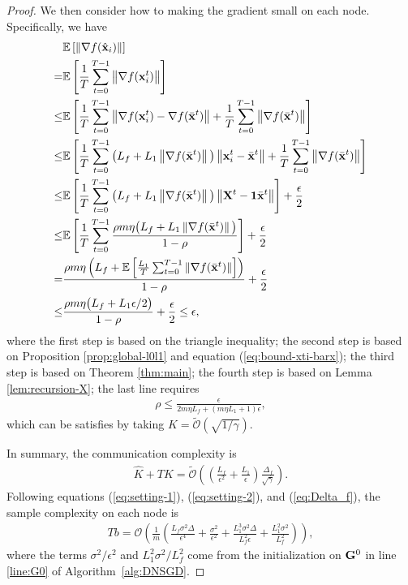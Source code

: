 \documentclass[sigconf]{acmart}
\newcommand{\Norm}[1]{\left\| #1 \right\|}
\def\vone{{\bf{1}}}
\def\vx{{\bf{x}}}
\def\fO{{\mathcal{O}}}
\def\BE{{\mathbb{E}}}
\def\mG {{\bf G}}
\def\mX {{\bf X}}
\theoremstyle{plain}
\def\bx{{\bar\vx}}
\begin{document}
\begin{proof}
We then consider how to making the gradient small on each node.
Specifically, we have
\begin{align*}
& \BE\left[\Norm{\nabla f(\hat\vx_i)}\right] \\
= & \BE\left[\frac{1}{T}\sum_{t=0}^{T-1}\Norm{\nabla f(\vx_i^t)}\right] \\
\leq & \BE\left[\frac{1}{T}\sum_{t=0}^{T-1}\Norm{\nabla f(\vx_i^t)-\nabla f(\bx^t)} + \frac{1}{T}\sum_{t=0}^{T-1}\Norm{\nabla f(\bx^t)}\right] \\
\leq & \BE\left[\frac{1}{T}\sum_{t=0}^{T-1}\big(L_f+L_1\Norm{\nabla f(\bx^t)}\big)\Norm{\vx_i^t - \bx^t} + \frac{1}{T}\sum_{t=0}^{T-1}\Norm{\nabla f(\bx^t)}\right] \\
\leq & \BE\left[\frac{1}{T}\sum_{t=0}^{T-1}\big(L_f+L_1\Norm{\nabla f(\bx^t)}\big)\Norm{\mX^t - \vone\bx^t
}\right] + \frac{\epsilon}{2} \\
\leq & \BE\left[\frac{1}{T}\sum_{t=0}^{T-1}\frac{\rho m\eta\big(L_f+L_1\Norm{\nabla f(\bx^t)}\big)}{1-\rho}\right] + \frac{\epsilon}{2} \\
= & \frac{\rho m\eta\left(L_f+\BE\left[\frac{L_1}{T}\sum_{t=0}^{T-1}\Norm{\nabla f(\bx^t)}\right]\right)}{1-\rho}+ \frac{\epsilon}{2} \\
\leq & \frac{\rho m\eta\big(L_f+L_1\epsilon/2
\big)}{1-\rho}+ \frac{\epsilon}{2} 
\leq \epsilon,
\end{align*}
where the first step is based on the triangle inequality;
the second step is based on Proposition \ref{prop:global-l0l1} and equation (\ref{eq:bound-xti-barx});
the third step is based on Theorem \ref{thm:main};
the fourth step is based on Lemma \ref{lem:recursion-X};
the last line requires
\begin{align*}
    \rho\leq\frac{\epsilon}{2m\eta L_f + (m\eta L_1+1)\epsilon},
\end{align*}
which can be satisfies by taking $K=\tilde\fO(\sqrt{1/\gamma})$. 

In summary, the communication complexity is
\begin{align*}
   \hat K + TK = \tilde\fO\left(\left(\frac{L_f}{\epsilon^2} + \frac{L_1}{\epsilon}\right)\frac{\Delta_f}{\sqrt{\gamma}}\right).
\end{align*}
Following equations (\ref{eq:setting-1}), (\ref{eq:setting-2}), and (\ref{eq:Delta_f}), the sample complexity on each node is
\begin{align*}
Tb = \fO\left(\frac{1}{m}\left(\frac{L_f\sigma^2\Delta}{\epsilon^4} + \frac{\sigma^2}{\epsilon^2} + \frac{L_1^3\sigma^2\Delta}{L_f^2 \epsilon} + \frac{L_1^2\sigma^2 }{L_f^2} \right)\right), 
\end{align*}    
where the terms $\sigma^2/\epsilon^2$ and $L_1^2\sigma^2/L_f^2$ come from the initialization on $\mG^0$ in line \ref{line:G0} of Algorithm~\ref{alg:DNSGD}.
\end{proof}
\end{document}
